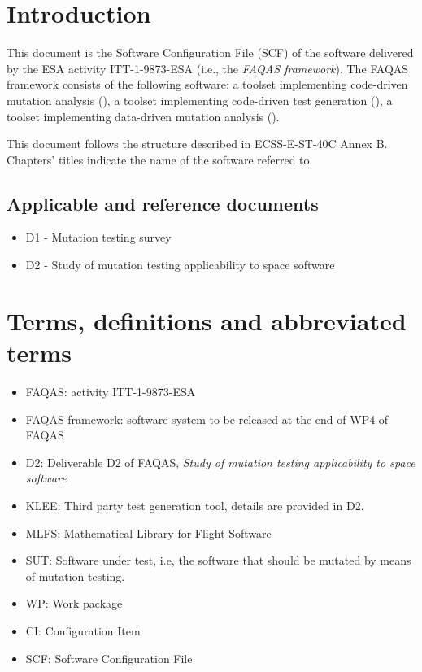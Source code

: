 
\chapter{Introduction}

This document is the Software Configuration File (SCF) of the software delivered by the ESA activity ITT-1-9873-ESA (i.e., the \emph{FAQAS framework}).
The FAQAS framework consists of the following software: a toolset  implementing code-driven mutation analysis (\MASS), a toolset implementing code-driven test generation (\SEMUS), a toolset implementing data-driven mutation analysis (\DAMA).

This document follows the structure described in ECSS-E-ST-40C Annex B. Chapters' titles indicate the name of the software referred to.

\section{Applicable and reference documents}

\begin{itemize}
\item{D1 - Mutation testing survey}
\item{D2 - Study of mutation testing applicability to space software}
\end{itemize}

\chapter{Terms, definitions and abbreviated terms}

\begin{itemize}
\item{FAQAS}: activity ITT-1-9873-ESA
\item{FAQAS-framework}: software system to be released at the end of WP4 of FAQAS
\item{D2}: Deliverable D2 of FAQAS, \emph{Study of mutation testing applicability to space software}
\item{KLEE}: Third party test generation tool, details are provided in D2.
\item{MLFS}: Mathematical Library for Flight Software
\item{SUT}: Software under test, i.e, the software that should be mutated by means of mutation testing.
\item{WP}: Work package
\item{CI}: Configuration Item
\item{SCF}: Software Configuration File

\end{itemize}

\clearpage
